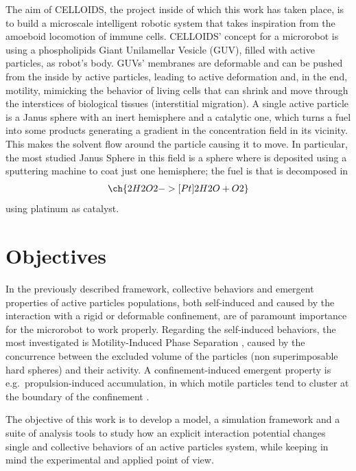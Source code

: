 \documentclass[../../master_thesis_np.tex]{subfiles}
\begin{document}
	The aim of CELLOIDS, the project inside of which this work has taken place, is to build a microscale intelligent robotic system that takes inspiration from the amoeboid locomotion of immune cells. 
	CELLOIDS' concept for a microrobot is using a phospholipids Giant Unilamellar Vesicle (GUV), filled with active particles, as robot's body. 
	GUVs' membranes are deformable and can be pushed from the inside by active particles, leading to active deformation and, in the end, motility, mimicking the behavior of living cells that can shrink and move through the interstices of biological tissues (interstitial migration). 
	A single active particle is a Janus sphere with an inert hemisphere and a catalytic one, which turns a fuel into some products generating a gradient in the concentration field in its vicinity. 
	This makes the solvent flow around the particle causing it to move. 
	In particular, the most studied Janus Sphere in this field is a  sphere where  is deposited using a sputtering machine to coat just one hemisphere; the fuel is  that is decomposed in 
	\begin{align}
		\ch{2 H2O2 ->[Pt] 2 H2O + O2}
	\end{align}
	using platinum as catalyst.
	
	
	\section{Objectives}	
	In the previously described framework, collective behaviors and emergent properties of active particles populations, both self-induced and caused by the interaction with a rigid or deformable confinement, are of paramount importance for the microrobot to work properly. 
	Regarding the self-induced behaviors, the most investigated is Motility-Induced Phase Separation \cite{cates_motility-induced_2015}, caused by the concurrence between the excluded volume of the particles (non superimposable hard spheres) and their activity. 
	A confinement-induced emergent property is e.g.~propulsion-induced accumulation, in which motile particles tend to cluster at the boundary of the confinement \cite{marconi_towards_2015}.
	
	The objective of this work is to develop a model, a simulation framework and a suite of analysis tools to study how an explicit interaction potential changes single and collective behaviors of an active particles system, while keeping in mind the experimental and applied point of view. 
	
\end{document}
